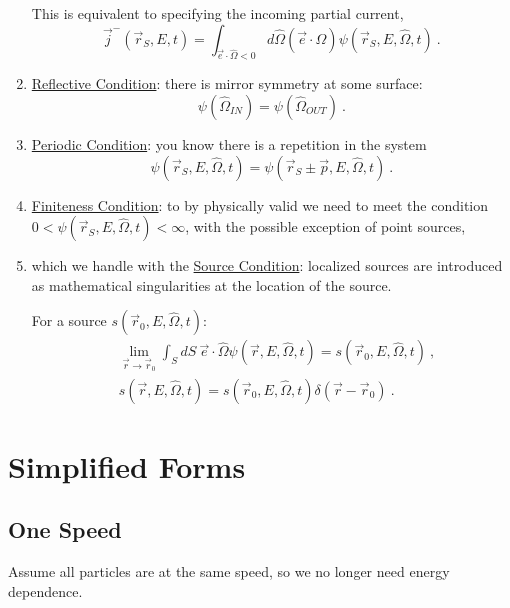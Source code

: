 \documentclass[12pt]{article}
\newcommand{\vOmega}{\ensuremath{\hat{\Omega}}}
\begin{document}
\begin{enumerate}
\begin{minipage}{0.45\textwidth}
This is equivalent to specifying the incoming partial current, $$\vec{j}^-(\vec{r}_S, E, t) = \int_{\vec{e} \cdot \vOmega < 0} d\vOmega (\vec{e} \cdot \vOmega) \psi(\vec{r}_S, E, \vOmega, t)\:.$$
\end{minipage}

\item \underline{Reflective Condition}: there is mirror symmetry at some surface:
\[\psi(\vOmega_{IN}) = \psi(\vOmega_{OUT})\:.\]

\item \underline{Periodic Condition}: you know there is a repetition in the system
\[\psi(\vec{r}_S, E, \vOmega, t) = \psi(\vec{r}_S \pm \vec{p}, E, \vOmega, t)\:.\]

\item \underline{Finiteness Condition}: to by physically valid we need to meet the condition \\$0 < \psi(\vec{r}_S, E, \vOmega, t) < \infty$, with the possible exception of point sources,

\item which we handle with the \underline{Source Condition}: localized sources are introduced as mathematical singularities at the location of the source.

For a source $s(\vec{r}_0, E, \vOmega, t)$:
\begin{align*}
&\lim_{\vec{r} \rightarrow \vec{r}_0} \int_S dS\: \vec{e} \cdot \vOmega \psi(\vec{r}, E, \vOmega, t) = s(\vec{r}_0, E, \vOmega, t)\:, \\
&s(\vec{r}, E, \vOmega, t) = s(\vec{r}_0, E, \vOmega, t)\delta(\vec{r} - \vec{r}_0)\:.
\end{align*}
\end{enumerate}


\section*{Simplified Forms}

\subsection*{One Speed}
Assume all particles are at the same speed, so we no longer need energy dependence.

%
\end{document}
